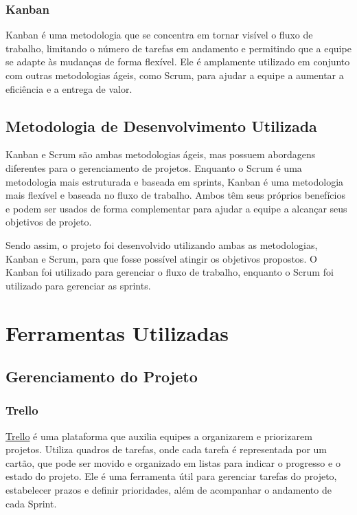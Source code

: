 \subsubsection{Kanban}

Kanban é uma metodologia que se concentra em tornar visível o fluxo de trabalho, limitando o número de tarefas em andamento e permitindo que a equipe se adapte às mudanças de forma flexível. Ele é amplamente utilizado em conjunto com outras metodologias ágeis, como Scrum, para ajudar a equipe a aumentar a eficiência e a entrega de valor. \cite{Lage2008}

\subsection{Metodologia de Desenvolvimento Utilizada}

Kanban e Scrum são ambas metodologias ágeis, mas possuem abordagens diferentes para o gerenciamento de projetos. Enquanto o Scrum é uma metodologia mais estruturada e baseada em sprints, Kanban é uma metodologia mais flexível e baseada no fluxo de trabalho. Ambos têm seus próprios benefícios e podem ser usados de forma complementar para ajudar a equipe a alcançar seus objetivos de projeto. \cite{Kniberg2010}

Sendo assim, o projeto foi desenvolvido utilizando ambas as metodologias, Kanban e Scrum, para que fosse possível atingir os objetivos propostos. O Kanban foi utilizado para gerenciar o fluxo de trabalho, enquanto o Scrum foi utilizado para gerenciar as sprints.

\section{Ferramentas Utilizadas}

\subsection{Gerenciamento do Projeto}

\subsubsection{Trello}

\href{https://trello.com/}{Trello} é uma plataforma que auxilia equipes a organizarem e priorizarem projetos. Utiliza quadros de tarefas, onde cada tarefa é representada por um cartão, que pode ser movido e organizado em listas para indicar o progresso e o estado do projeto. Ele é uma ferramenta útil para gerenciar tarefas do projeto, estabelecer prazos e definir prioridades, além de acompanhar o andamento de cada Sprint.

